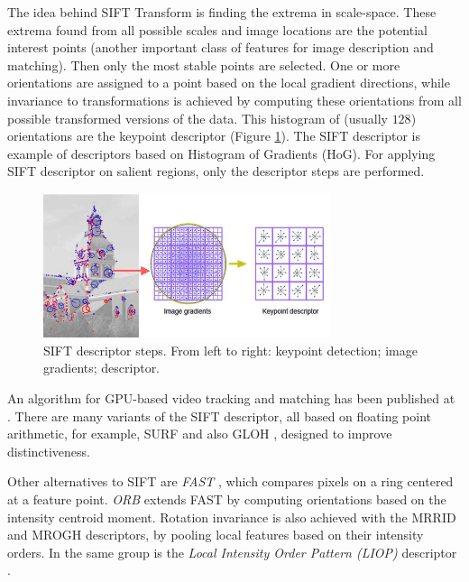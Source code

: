 The idea behind SIFT Transform is finding the extrema in scale-space. These extrema found from all possible scales and image locations are the potential interest points (another important class of features for image description and matching). Then only the most stable points are selected. One or more orientations are assigned to a point based on the local gradient directions, while invariance to transformations is achieved by computing these orientations from all possible transformed versions of the data.  This histogram of (usually $128$) orientations are the keypoint descriptor (Figure \ref{fig:sift}). The SIFT descriptor is example of descriptors based on Histogram of Gradients (HoG). For applying SIFT descriptor on salient regions, only the descriptor steps are performed. 

\begin{figure}[H]
\begin{center}
\includegraphics[width=0.75\textwidth]{fig/SIFT}
\end{center}
\caption{SIFT descriptor steps. From left to right: keypoint detection; image gradients; descriptor.}
\label{fig:sift}
\end{figure}

An algorithm for GPU-based video tracking and matching has been published at \cite{Sinha06gpu-basedvideo}. There are many variants of the SIFT descriptor, all based on floating point arithmetic, for example, SURF\cite{Bay:2008:SURF} and also GLOH \cite{MS05}, designed to improve distinctiveness.  

Other alternatives to SIFT are {\em FAST} \cite{Rosten:2006}, which compares pixels on a ring centered at a feature point. {\em  ORB} \cite{Rublee:2011} extends FAST by computing orientations based on the intensity centroid moment. Rotation invariance is also achieved with the MRRID and MROGH descriptors, \cite{journals:pami:FanWH12} by pooling local features based on their intensity orders. In the same group is the {\em Local Intensity Order Pattern (LIOP)} descriptor \cite{ZhenhuaWang:2011:LIO}. 

